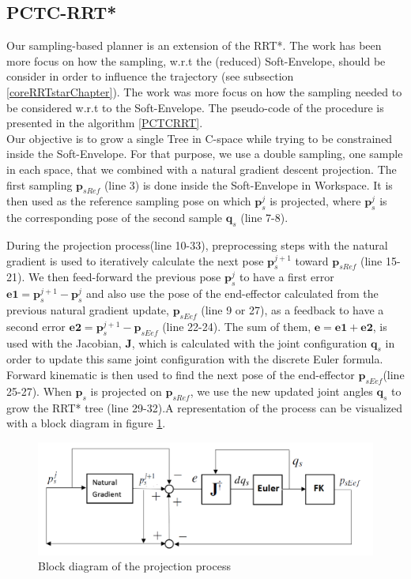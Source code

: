 \documentclass[letterpaper, 10 pt, conference]{ieeeconf}  %
\newcommand{\mb}[1]{{\boldsymbol{#1}}}
\begin{document}
\subsection{PCTC-RRT*} 
Our sampling-based planner is an extension of the RRT*. The work has been more focus on how the sampling, w.r.t the (reduced) Soft-Envelope, should be consider in order to influence the trajectory (see subsection \ref{coreRRTstarChapter}). The work was more focus on how the sampling needed to be considered w.r.t to the Soft-Envelope. The pseudo-code of the procedure is presented in the algorithm \ref{PCTCRRT}.\\
Our objective is to grow a single Tree in C-space while trying to be constrained inside the Soft-Envelope. For that purpose, we use a double sampling, one sample in each space, that we combined with a natural gradient descent projection.
The first sampling $\mb{p}_{sRef}$ (line 3) is done inside the Soft-Envelope in Workspace. It is then used as the reference sampling pose on which $\mb{p}_s^j$ is projected, where $\mb{p}_s^j$ is the corresponding pose of the second sample $\mb{q}_s$ (line 7-8).

During the projection process(line 10-33), preprocessing steps with the natural gradient is used to iteratively calculate the next pose $\mb{p}_s^{j+1}$ toward $\mb{p}_{sRef}$  (line 15-21). We then feed-forward the previous pose $\mb{p}_s^{j}$ to have a first error $\mb{e1}=\mb{p}_s^{j+1} - \mb{p}_s^{j}$ and also use the pose of the end-effector calculated from the previous natural gradient update, $\mb{p}_{sEef}$ (line 9 or 27), as a feedback to have a second error $\mb{e2}=\mb{p}_s^{j+1} - \mb{p}_{sEef}$ (line 22-24). The sum of them, $\mb{e}=\mb{e1}+\mb{e2}$, is used with the Jacobian, $\mb{J}$, which is calculated with the joint configuration $\mb{q}_s$ in order to update this same joint configuration with the discrete Euler formula. Forward kinematic is then used to find the next pose of the end-effector $\mb{p}_{sEef}$(line 25-27). When $\mb{p}_s$ is projected on $\mb{p}_{sRef}$, we use the new updated joint angles $\mb{q}_s$ to grow the RRT* tree (line 29-32).A representation of the process can be visualized with a block diagram in figure \ref{loopControl}.\\

\begin{figure}[h]
	\centering
	\includegraphics[scale=0.35]{figure/loopControl.png}
	\caption{Block diagram of the projection process}
	\label{loopControl}
\end{figure}
\end{document}
